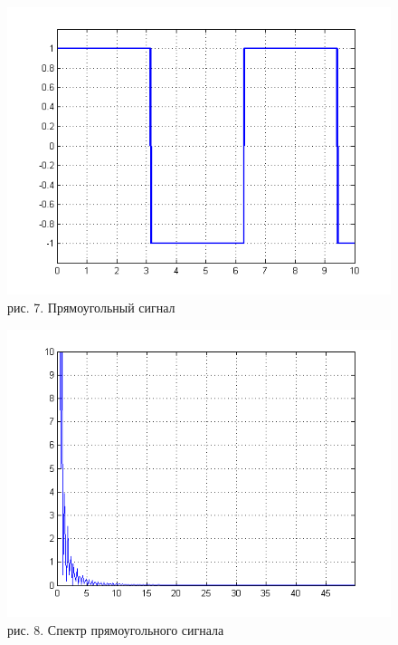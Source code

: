 \documentclass[10pt,a4paper]{report}
\begin{document}
\begin{figure}
\begin{center}
\includegraphics[angle=0, scale = 0.9]{5_3.png}\newline
рис. 7. Прямоугольный сигнал\newline
\end{center}
\end{figure}
\begin{figure}
\begin{center}
\includegraphics[angle=0, scale = 0.9]{5_4.png}\newline
рис. 8. Спектр прямоугольного сигнала\newline
\end{center}
\end{figure}
\end{document}
